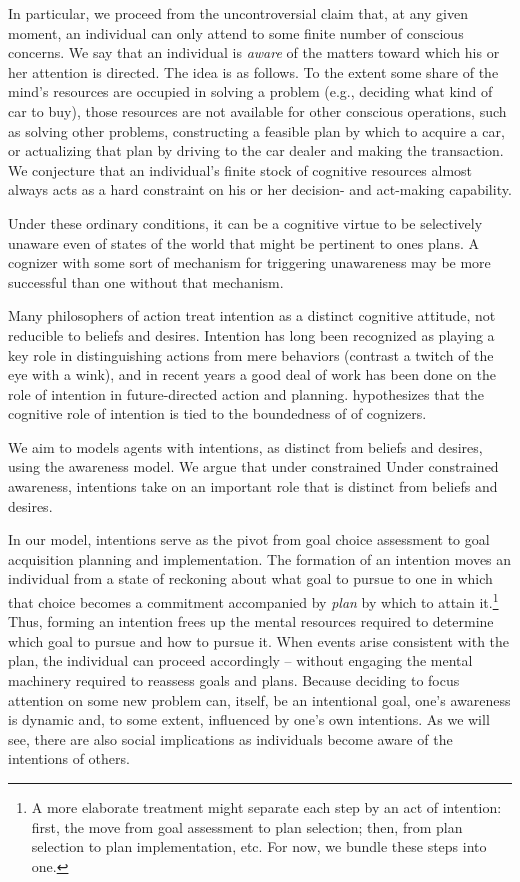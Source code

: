 \documentclass[
11pt,
titlepage,
reqno,
]{article}%
\theoremstyle{definition}
\begin{document}
In particular, we proceed from the uncontroversial claim that, at any given moment, an individual can only  attend to some finite number of conscious concerns. 
We say that an individual is \textit{aware} of the matters toward which his or her attention is directed.
The idea is as follows.
To the extent some share of the mind's resources are occupied in solving a problem (e.g., deciding what kind of car to buy), those resources are not available for other conscious operations, such as solving other problems, constructing a feasible plan by which to acquire a car, or actualizing that plan by driving to the car dealer and making the transaction.
We conjecture that an individual's finite stock of cognitive resources almost always acts as a hard constraint on his or her decision- and act-making capability.

Under these ordinary conditions, it can be a cognitive virtue to be selectively unaware even of states of the world that might be pertinent to ones plans. A cognizer with some sort of mechanism for triggering unawareness may be more successful than one without that mechanism.

Many philosophers of action treat intention as a distinct cognitive attitude, not reducible to beliefs and desires. Intention has long been recognized as playing a key role in distinguishing actions from mere behaviors (contrast a twitch of the eye with a wink), and in recent years a good deal of work has been done on the role of intention in future-directed action and planning. \citet{Bratman1987} hypothesizes that the cognitive role of intention is tied to the boundedness of of cognizers.

We aim to models agents with intentions, as distinct from beliefs and desires, using the awareness model. We argue that under constrained 
Under constrained awareness, intentions take on an important role that is distinct from beliefs and desires.

In our model, intentions serve as the pivot from goal choice assessment to goal acquisition planning and implementation.
The formation of an intention moves an individual from a state of reckoning about what goal to pursue to one in which that choice becomes a commitment accompanied by \textit{plan} by which to attain it.\footnote
{
	A more elaborate treatment might separate each step by an act of intention: first, the move from goal assessment to plan selection; then, from plan selection to plan implementation, etc. For now, we bundle these steps into one.
}
Thus, forming an intention frees up the mental resources required to determine which goal to pursue and how to pursue it.
When events arise consistent with the plan, the individual can proceed accordingly -- without engaging the mental machinery required to reassess goals and plans.
Because deciding to focus attention on some new problem can, itself, be an intentional goal, one's awareness is dynamic and, to some extent, influenced by one's own intentions.
As we will see, there are also social implications as individuals become aware of the intentions of others.  
\end{document}

